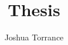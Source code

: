 \documentclass[11pt]{report}
\begin{document}
\title{Thesis}

\author{Joshua Torrance}

\maketitle

\tableofcontents



\printglossary
\end{document}
